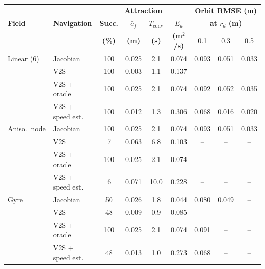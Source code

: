 \begin{tabular}{ll|cccc|ccc}
\hline
 & & \multicolumn{4}{c|}{\textbf{Attraction}} & \multicolumn{3}{c}{\textbf{Orbit RMSE (m)}} \\
\textbf{Field} & \textbf{Navigation} & \textbf{Succ.} & \textbf{$\bar{e}_f$} & \textbf{$T_{\mathrm{conv}}$} & \textbf{$E_u$} & \multicolumn{3}{c}{\textbf{at $r_d$ (m)}} \\
 & & \textbf{(\%)} & \textbf{(m)} & \textbf{(s)} & \textbf{(m$^2$/s)} & 0.1 & 0.3 & 0.5 \\
\hline
Linear (6) & Jacobian & 100 & 0.025 & 2.1 & 0.074 & 0.093 & 0.051 & 0.033 \\
 & V2S & 100 & 0.003 & 1.1 & 0.137 & -- & -- & -- \\
 & V2S + oracle & 100 & 0.025 & 2.1 & 0.074 & 0.092 & 0.052 & 0.035 \\
 & V2S + speed est. & 100 & 0.012 & 1.3 & 0.306 & 0.068 & 0.016 & 0.020 \\
\hline
Aniso.\ node & Jacobian & 100 & 0.025 & 2.1 & 0.074 & 0.093 & 0.051 & 0.033 \\
 & V2S & 7 & 0.063 & 6.8 & 0.103 & -- & -- & -- \\
 & V2S + oracle & 100 & 0.025 & 2.1 & 0.074 & -- & -- & -- \\
 & V2S + speed est. & 6 & 0.071 & 10.0 & 0.228 & -- & -- & -- \\
\hline
Gyre & Jacobian & 50 & 0.026 & 1.8 & 0.044 & 0.080 & 0.049 & -- \\
 & V2S & 48 & 0.009 & 0.9 & 0.085 & -- & -- & -- \\
 & V2S + oracle & 100 & 0.025 & 2.1 & 0.074 & 0.091 & -- & -- \\
 & V2S + speed est. & 48 & 0.013 & 1.0 & 0.273 & 0.068 & -- & -- \\
\hline
\end{tabular}
